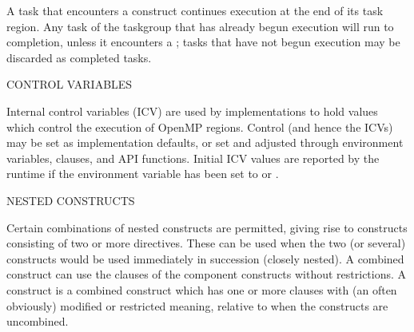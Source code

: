 A task that encounters a  construct continues execution at the end of its
task region. Any task of the taskgroup that has already begun execution will run to completion,
unless it encounters a ; tasks that have not begun execution may be
discarded as completed tasks.

\pagebreak
CONTROL VARIABLES 

  Internal control variables (ICV) are used by implementations to hold values which control the execution
  of OpenMP regions.  Control (and hence the ICVs) may be set as implementation defaults, 
  or set and adjusted through environment variables, clauses, and API functions.  
  Initial ICV values are reported by the runtime
  if the  environment variable has been set to  or . 


\bigskip
NESTED CONSTRUCTS

Certain combinations of nested constructs are permitted, giving rise to  constructs
consisting of two or more directives.  These can be used when the two (or several) constructs would be used
immediately in succession (closely nested). A combined construct can use the clauses of the component
constructs without restrictions.
A  construct is a combined construct which has one or more clauses with (an often obviously)
modified or restricted meaning, relative to when the constructs are uncombined. %


